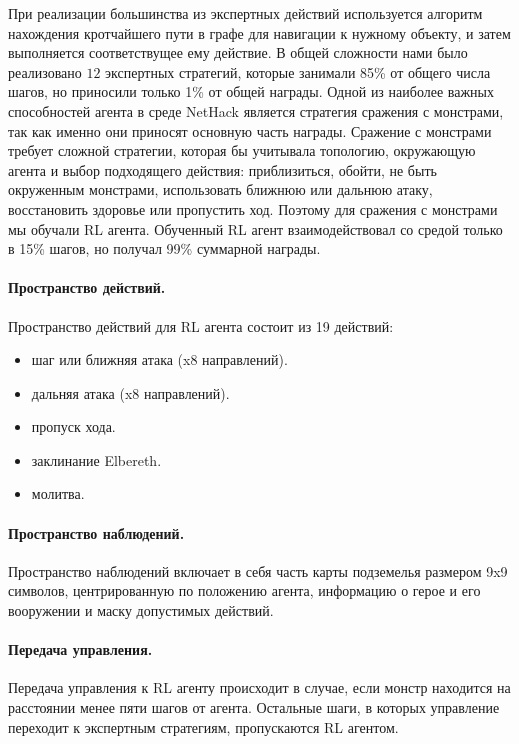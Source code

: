 При реализации большинства из экспертных действий используется алгоритм нахождения кротчайшего пути в графе для навигации к нужному объекту, и затем выполняется соответствущее ему действие. В общей сложности нами было реализовано $12$ экспертных стратегий, которые занимали 85\% от общего числа шагов, но приносили только 1\% от общей награды. Одной из наиболее важных способностей агента в среде NetHack является стратегия сражения с монстрами, так как именно они приносят основную часть награды. Сражение с монстрами требует сложной стратегии, которая бы учитывала топологию, окружающую агента и выбор подходящего действия: приблизиться, обойти, не быть окруженным монстрами, использовать ближнюю или дальнюю атаку, восстановить здоровье или пропустить ход. Поэтому для сражения с монстрами мы обучали RL агента. Обученный RL агент взаимодействовал со средой только в 15\% шагов, но получал 99\% суммарной награды. 

\paragraph{Пространство действий.} Пространство действий для RL агента состоит из 19 действий:
\begin{itemize}
    \item шаг или ближняя атака (x8 направлений).
    \item дальняя атака (x8 направлений).
    \item пропуск хода.
    \item заклинание Elbereth.
    \item молитва.
\end{itemize}

\paragraph{Пространство наблюдений.} Пространство наблюдений включает в себя часть карты подземелья размером 9x9 символов, центрированную по положению агента, информацию о герое и его вооружении и маску допустимых действий. 

\paragraph{Передача управления.}
Передача управления к RL агенту происходит в случае, если монстр находится на расстоянии менее пяти шагов от агента. Остальные шаги, в которых управление переходит к экспертным стратегиям, пропускаются RL агентом. 


